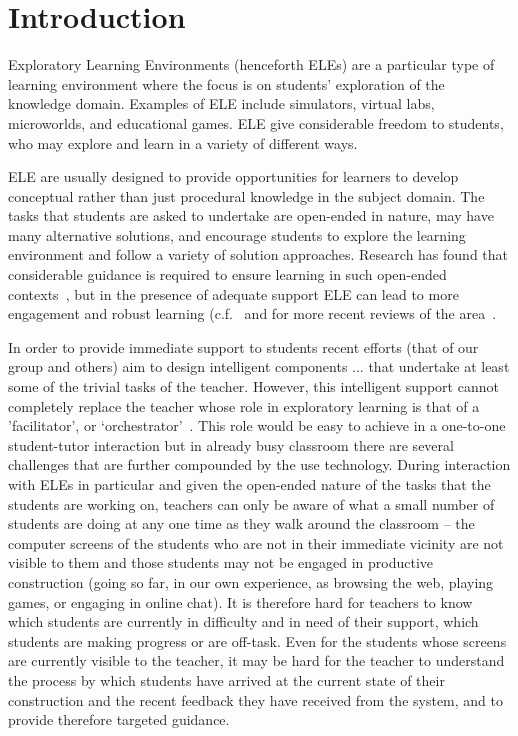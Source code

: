 \section{Introduction}
\label{sec:introduction}

Exploratory Learning Environments (henceforth ELEs) are a particular
type of learning environment where the focus is on students'
exploration of the knowledge domain. Examples of ELE
include simulators, virtual labs, microworlds, and educational
games. ELE give considerable freedom to students, who may explore and
learn in a variety of different ways.

ELE are usually designed to provide opportunities for learners to
develop conceptual rather than just procedural knowledge in the subject
domain. The tasks that students are asked to
undertake are open-ended in nature, may have many alternative
solutions, and encourage students to explore the learning
environment and follow a variety of solution approaches. Research
has found that considerable guidance is required to ensure learning in
such open-ended contexts~\cite{kirschner06,Kynigos92,MayerDiscovery},
but in the presence of adequate support ELE can lead to more engagement
and robust learning (c.f.~\cite{Noss96,JongJoolingen98} and for more
recent reviews of the area~\cite{InquiryLearningJoolingen,HealyKynigosZDM2010}. 

In order to provide immediate support to students recent efforts  
(that of our group and others) aim to design intelligent components ... 
that undertake at least some of the trivial tasks of the teacher. 
However, this intelligent support cannot completely replace the teacher 
whose role in exploratory learning is that 
of a 'facilitator’, or
`orchestrator'~\cite{Trouche2004,Hoyles2004Integration}. This role
would be easy to achieve in a one-to-one student-tutor interaction but in already
 busy classroom there are several challenges that are further compounded by the 
use technology. During interaction with ELEs in particular and given the
open-ended nature of the tasks that the students are working on,
 teachers can only be aware of what a small number of
students are doing at any one time as they walk around the classroom –
the computer screens of the students who are not in their immediate
vicinity are not visible to them and those students may not be engaged
in productive construction (going so far, in our own experience, as
browsing the web, playing games, or engaging in online chat). It is
therefore hard for teachers to know which students are currently in
difficulty and in need of their support, which students are making
progress or are off-task. Even for the
students whose screens are currently visible to the teacher, it may be
hard for the teacher to understand the process by which students have
arrived at the current state of their construction and the recent
feedback they have received from the system, and to provide therefore
targeted guidance. 

